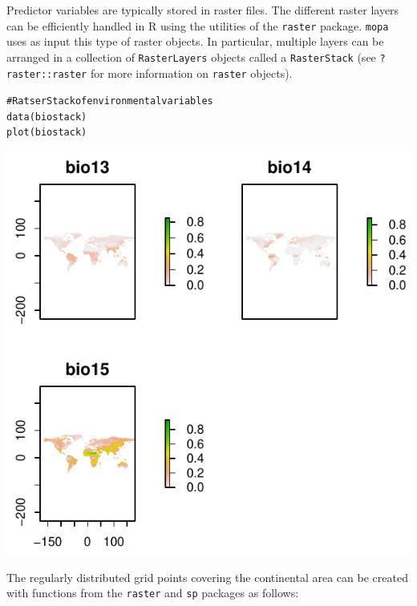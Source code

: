 \documentclass[10pt,a4paper]{article}\usepackage[]{graphicx}\usepackage[]{color}
\makeatletter
\def\maxwidth{ %
  \ifdim\Gin@nat@width>\linewidth
    \linewidth
  \else
    \Gin@nat@width
  \fi
}
\newcommand{\hlcom}[1]{\textcolor[rgb]{1,0.533,0}{#1}}%
\newcommand{\hlstd}[1]{\textcolor[rgb]{0,0,0}{#1}}%
\newcommand{\hlkwd}[1]{\textcolor[rgb]{0,0.267,0.4}{#1}}%
\newenvironment{kframe}{%
 \def\at@end@of@kframe{}%
 \ifinner\ifhmode%
  \def\at@end@of@kframe{\end{minipage}}%
  \begin{minipage}{\columnwidth}%
 \fi\fi%
 \def\FrameCommand##1{\hskip\@totalleftmargin \hskip-\fboxsep
 \colorbox{shadecolor}{##1}\hskip-\fboxsep
     \hskip-\linewidth \hskip-\@totalleftmargin \hskip\columnwidth}%
 \MakeFramed {\advance\hsize-\width
   \@totalleftmargin\z@ \linewidth\hsize
   \@setminipage}}%
 {\par\unskip\endMakeFramed%
 \at@end@of@kframe}
\newenvironment{knitrout}{}{} %
\makeatother
\begin{document}
Predictor variables are typically stored in raster files. The different raster layers can be efficiently handled in R using the utilities of the \texttt{raster} package. \texttt{mopa} uses as input this type of raster objects. In particular, multiple layers can be arranged in a collection of \texttt{RasterLayers} objects called a \texttt{RasterStack} (see \texttt{?raster::raster} for more information on \texttt{raster} objects). 


\begin{knitrout}
\color{fgcolor}\begin{kframe}
\begin{alltt}
\hlcom{# RatserStack of environmental variables}
\hlkwd{data}\hlstd{(biostack)}
\hlkwd{plot}\hlstd{(biostack)}
\end{alltt}
\end{kframe}

{\centering \includegraphics[width=\maxwidth]{figure/graphics-mopa3-1} 

}



\end{knitrout}

The regularly distributed grid points covering the continental area can be created with functions from the \texttt{raster} and \texttt{sp} packages as follows:
\end{document}
